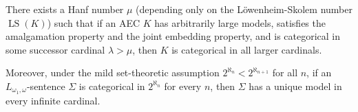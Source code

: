 There exists a Hanf number $\mu$ (depending only on the L\"owenheim-Skolem number $\operatorname{LS}(K)$) such that if an AEC $K$ has arbitrarily large models, satisfies the amalgamation property and the joint embedding property, and is categorical in some successor cardinal $\lambda > \mu$, then $K$ is categorical in all larger cardinals.
  
Moreover, under the mild set-theoretic assumption $2^{\aleph_n} < 2^{\aleph_{n+1}}$ for all $n$, if an $L_{\omega_1,\omega}$-sentence $\Sigma$ is categorical in $2^{\aleph_n}$ for every $n$, then $\Sigma$ has a unique model in every infinite cardinal.
